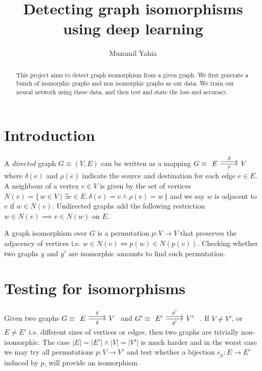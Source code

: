 \documentclass[letterpaper,UKenglish]{lipics-v2018}
\title{Detecting graph isomorphisms using deep learning}
\author{Muzamil Yahia}{University of Hawaii at Manoa}{}{}{}%
\begin{document}
\maketitle

\begin{abstract}
This project aims to detect graph isomorphism from a given graph. We first generate a bunch of isomorphic graphs and non isomorphic graphs as our data. We train our neural network using these data, and then test and state the loss and accuracy.
\end{abstract}


\section{Introduction}
A \emph{directed} graph $G \equiv (V,E)$ can be written as a mapping $G \equiv \begin{tikzcd} E \arrow[r,"\rho",swap] \arrow[r,"\delta",shift left = .8ex]& V \end{tikzcd}$ where $\delta(e)$ and $\rho(e)$ indicate the source and destination for each edge $e \in E$. A neighbour of a vertex $v \in V$ is given by the set of vertices $N(v) = \{\, w \in V \mid \exists e \in E. \,  \delta(e) = v \wedge \rho(e) = w   \,\}$ and we say $w$ is adjacent to $v$ if $w \in N(v)$. Undirected graphs add the following restriction $w \in N(v) \implies v \in N(w)$ on $E$.

A graph isomorphism over $G$ is a permutation $p \colon V \to V$ that preserves the adjacency of vertices i.e. $ w \in N(v) \Leftrightarrow p(w) \in N(p(v))$. Checking whether two graphs $g$ and $g'$ are isomorphic amounts to find such permutation. 

\section{Testing for isomorphisms}
Given two graphs $G \equiv \begin{tikzcd} E \arrow[r,"\delta",swap] \arrow[r,"\delta",shift left = .8ex]& V \end{tikzcd}$ and $G' \equiv \begin{tikzcd} E' \arrow[r,"\delta'",swap] \arrow[r,"\rho'",shift left = .8ex]& V' \end{tikzcd}$ . If $V \neq V'$, or $E \neq E'$ i.e. different sizes of vertices or edges, then two graphs are trivially non-isomorphic. The case $|E| = |E'| \wedge |V| = |V'|$ is much harder and in the worst case we may try all permutations $p \colon V \to V'$ and test whether a bijection $e_p\colon E \to E'$ induced by $p$, will provide an isomorphism.
\end{document}
